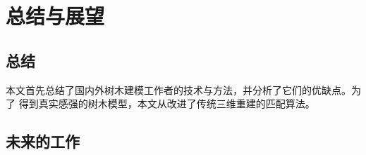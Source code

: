 
\chapter{总结与展望}

\section{总结}
本文首先总结了国内外树木建模工作者的技术与方法，并分析了它们的优缺点。为了
得到真实感强的树木模型，本文从改进了传统三维重建的匹配算法。

\section{未来的工作}
